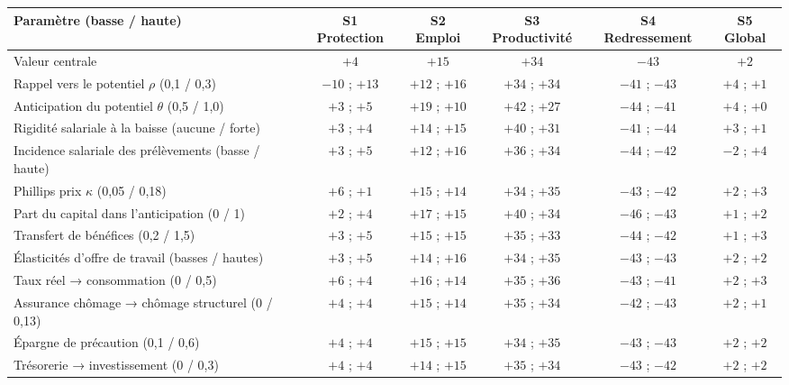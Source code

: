 \begin{tabular}{lccccc}\toprule
Paramètre (basse / haute) & S1 Protection & S2 Emploi & S3 Productivité & S4 Redressement & S5 Global \\ \midrule
Valeur centrale & $+4$ & $+15$ & $+34$ & $-43$ & $+2$ \\ \midrule
Rappel vers le potentiel $\rho$ (0,1 / 0,3) & $-10$ ; $+13$ & $+12$ ; $+16$ & $+34$ ; $+34$ & $-41$ ; $-43$ & $+4$ ; $+1$ \\
Anticipation du potentiel $\theta$ (0,5 / 1,0) & $+3$ ; $+5$ & $+19$ ; $+10$ & $+42$ ; $+27$ & $-44$ ; $-41$ & $+4$ ; $+0$ \\
Rigidité salariale à la baisse (aucune / forte) & $+3$ ; $+4$ & $+14$ ; $+15$ & $+40$ ; $+31$ & $-41$ ; $-44$ & $+3$ ; $+1$ \\
Incidence salariale des prélèvements (basse / haute) & $+3$ ; $+5$ & $+12$ ; $+16$ & $+36$ ; $+34$ & $-44$ ; $-42$ & $-2$ ; $+4$ \\
Phillips prix $\kappa$ (0,05 / 0,18) & $+6$ ; $+1$ & $+15$ ; $+14$ & $+34$ ; $+35$ & $-43$ ; $-42$ & $+2$ ; $+3$ \\
Part du capital dans l'anticipation (0 / 1) & $+2$ ; $+4$ & $+17$ ; $+15$ & $+40$ ; $+34$ & $-46$ ; $-43$ & $+1$ ; $+2$ \\
Transfert de bénéfices (0,2 / 1,5) & $+3$ ; $+5$ & $+15$ ; $+15$ & $+35$ ; $+33$ & $-44$ ; $-42$ & $+1$ ; $+3$ \\
Élasticités d'offre de travail (basses / hautes) & $+3$ ; $+5$ & $+14$ ; $+16$ & $+34$ ; $+35$ & $-43$ ; $-43$ & $+2$ ; $+2$ \\
Taux réel → consommation (0 / 0,5) & $+6$ ; $+4$ & $+16$ ; $+14$ & $+35$ ; $+36$ & $-43$ ; $-41$ & $+2$ ; $+3$ \\
Assurance chômage → chômage structurel (0 / 0,13) & $+4$ ; $+4$ & $+15$ ; $+14$ & $+35$ ; $+34$ & $-42$ ; $-43$ & $+2$ ; $+1$ \\
Épargne de précaution (0,1 / 0,6) & $+4$ ; $+4$ & $+15$ ; $+15$ & $+34$ ; $+35$ & $-43$ ; $-43$ & $+2$ ; $+2$ \\
Trésorerie → investissement (0 / 0,3) & $+4$ ; $+4$ & $+14$ ; $+15$ & $+35$ ; $+34$ & $-43$ ; $-42$ & $+2$ ; $+2$ \\
\bottomrule\end{tabular}
